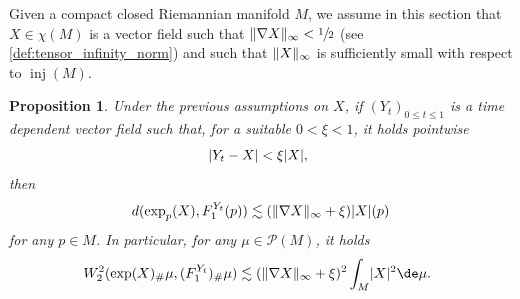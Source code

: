 \documentclass[JEP,XML,SOM,Unicode]{cedram}
\newcounter{results}[section]
\theoremstyle{plain}
\newtheorem{proposition}[results]{Proposition}
\theoremstyle{definition}
\numberwithin{equation}{section}
\newcommand{\prob}{\ensuremath{\mathcal{P}}}
\renewcommand{\comma}{\ensuremath{\text{, }}}
\newcommand{\comma}{\ensuremath{\text{, }}}
\newcommand{\fullstop}{\ensuremath{\text{. }}}
\DeclareMathOperator{\injradius}{inj}
\DeclarePairedDelimiter\abs{\lvert}{\rvert}
\DeclarePairedDelimiter\norm{\lVert}{\rVert}
\begin{document}
Given a compact closed Riemannian manifold $M$, we assume in this section that $X\in\chi(M)$ is a vector field such
that $\norm{\nabla X}_\infty<\sfrac12$ (see \cref{def:tensor_infinity_norm}) and such that
$\norm{X}_\infty$ is sufficiently small with respect to $\injradius(M)$.

\begin{proposition}\label{prop:stability_flow}
Under the previous assumptions on $X$,
if $(Y_t)_{0\le t\le 1}$ is a time dependent vector field such that, for a
suitable $0<\xi<1$, it holds pointwise
\begin{equation*}
\abs{Y_t-X} < \xi \abs{X}\comma
\end{equation*}
then
\begin{equation*}
d(\exp_p(X), F_1^{Y_t}(p)) \lesssim (\norm{\nabla X}_\infty + \xi)\abs{X}(p)
\end{equation*}
for any $p\in M$.
In particular, for any $\mu\in\prob(M)$, it holds
\begin{equation*}
W_2^2(\exp(X)_\#\mu, (F_1^{Y_t})_\#\mu)
\lesssim (\norm{\nabla X}_\infty+\xi)^2\int_M \abs{X}^2\de\mu \fullstop
\end{equation*}
\end{proposition}
\end{document}
